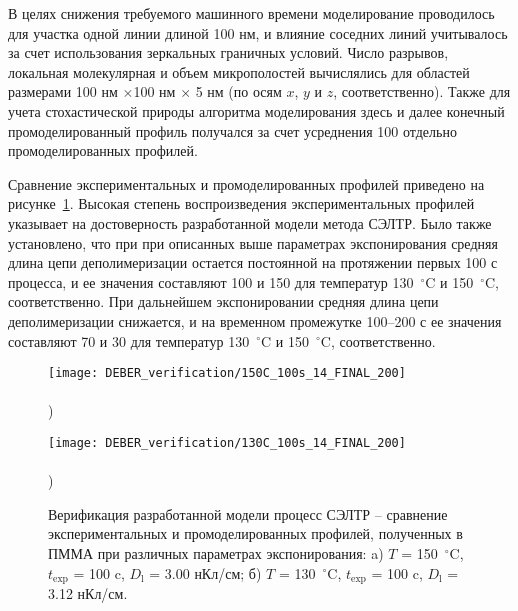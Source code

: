 В целях снижения требуемого машинного времени моделирование проводилось для участка одной линии длиной 100 нм, и влияние соседних линий учитывалось за счет использования зеркальных граничных условий. Число разрывов, локальная молекулярная и объем микрополостей вычислялись для областей размерами 100 нм $\times $100 нм $\times$ 5 нм (по осям $x$, $y$ и $z$, соответственно). Также для учета стохастической природы алгоритма моделирования здесь и далее конечный промоделированный профиль получался за счет усреднения 100 отдельно промоделированных профилей.

Сравнение экспериментальных и промоделированных профилей приведено на рисунке~\ref{fig:DEBER_2_profiles}. Высокая степень воспроизведения экспериментальных профилей указывает на достоверность разработанной модели метода СЭЛТР. Было также установлено, что при при описанных выше параметрах экспонирования средняя длина цепи деполимеризации остается постоянной на протяжении первых 100 с процесса, и ее значения составляют 100 и 150 для температур 130~$^\circ$C и 150~$^\circ$C, соответственно. При дальнейшем экспонировании средняя длина цепи деполимеризации снижается, и на временном промежутке 100--200 с ее значения составляют 70 и 30 для температур 130~$^\circ$C и 150~$^\circ$C, соответственно.

\begin{figure}[t]
	\begin{minipage}{0.48\textwidth}
		\texttt{[image: DEBER\_verification/150C\_100s\_14\_FINAL\_200]} \\
		\vspace{-12em} \\ ) \\ \vspace{12em}
	\end{minipage}
	\begin{minipage}{0.48\textwidth}
		\texttt{[image: DEBER\_verification/130C\_100s\_14\_FINAL\_200]} \\
		\vspace{-12em} \\ ) \\ \vspace{12em}
	\end{minipage}
	
	\vspace{-3.5em}
	\caption{Верификация разработанной модели процесс СЭЛТР -- сравнение экспериментальных и промоделированных профилей, полученных в ПММА при различных параметрах экспонирования: a) $T$ = 150~$^\circ$C, $t_\mathrm{exp}$ = 100 c, $D_\mathrm{l}$ = 3.00 нКл/см; б) $T$ = 130~$^\circ$C, $t_\mathrm{exp}$ = 100 c, $D_\mathrm{l}$ = 3.12 нКл/см.}
	\label{fig:DEBER_2_profiles}
	\vspace{1em}
\end{figure}

